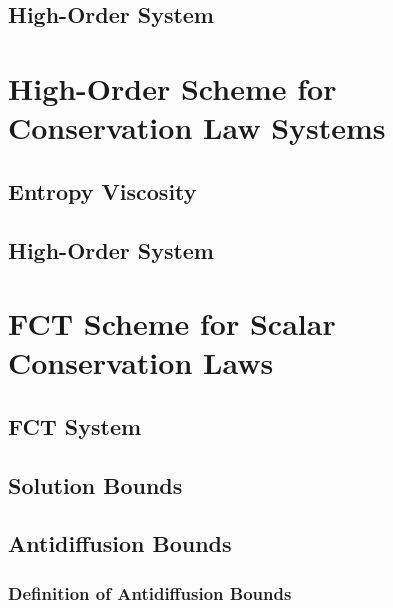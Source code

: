 \subsection{High-Order System\label{sec:high_order_scheme_scalar}}
  
\section{High-Order Scheme for Conservation Law Systems
  \label{sec:high_order_system}}  

\subsection{Entropy Viscosity\label{sec:entropy_viscosity_system}}
    
\subsection{High-Order System\label{sec:high_order_scheme_system}}
  
\section{FCT Scheme for Scalar Conservation Laws\label{sec:fct_scalar}}

\subsection{FCT System\label{sec:fct_scheme_scalar}}
  
\subsection{Solution Bounds\label{sec:fct_bounds}}
  
\subsection{Antidiffusion Bounds\label{sec:antidiffusion_bounds}}
  
  \subsubsection{Definition of Antidiffusion Bounds
    \label{sec:antidiffusion_bounds_def}}
    
    
    
